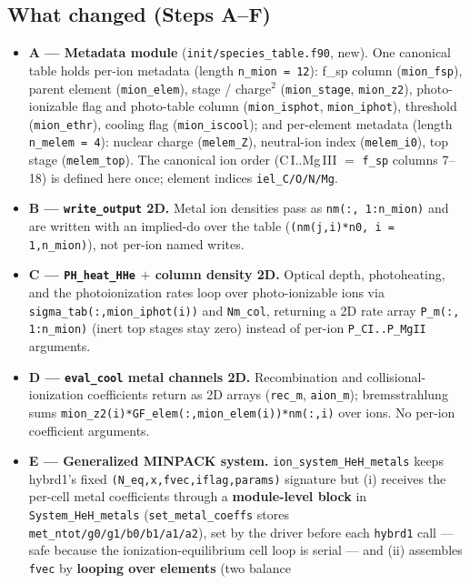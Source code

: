 \documentclass[english,a4paper]{kiseon_memo}
\begin{document}
\subsection{What changed (Steps A--F)}

{\sloppy
\begin{itemize}
\item \textbf{A --- Metadata module} (\texttt{init/species\_table.f90}, new). One
  canonical table holds per-ion metadata (length \verb|n_mion = 12|): f\_sp
  column (\verb|mion_fsp|), parent element (\verb|mion_elem|), stage / charge$^2$
  (\verb|mion_stage|, \verb|mion_z2|), photo-ionizable flag and photo-table column
  (\verb|mion_isphot|, \verb|mion_iphot|), threshold (\verb|mion_ethr|), cooling
  flag (\verb|mion_iscool|); and per-element metadata (length \verb|n_melem = 4|):
  nuclear charge (\verb|melem_Z|), neutral-ion index (\verb|melem_i0|), top stage
  (\verb|melem_top|). The canonical ion order (C\,I..Mg\,III $=$ \texttt{f\_sp}
  columns 7--18) is defined here once; element indices \verb|iel_C/O/N/Mg|.
\item \textbf{B --- \texttt{write\_output} 2D.} Metal ion densities pass as
  \verb|nm(:, 1:n_mion)| and are written with an implied-do over the table
  (\verb|(nm(j,i)*n0, i = 1,n_mion)|), not per-ion named writes.
\item \textbf{C --- \texttt{PH\_heat\_HHe} $+$ column density 2D.} Optical depth,
  photoheating, and the photoionization rates loop over photo-ionizable ions via
  \verb|sigma_tab(:,mion_iphot(i))| and \verb|Nm_col|, returning a 2D rate array
  \verb|P_m(:, 1:n_mion)| (inert top stages stay zero) instead of per-ion
  \verb|P_CI..P_MgII| arguments.
\item \textbf{D --- \texttt{eval\_cool} metal channels 2D.} Recombination and
  collisional-ionization coefficients return as 2D arrays (\verb|rec_m|,
  \verb|aion_m|); bremsstrahlung sums
  \verb|mion_z2(i)*GF_elem(:,mion_elem(i))*nm(:,i)| over ions. No per-ion
  coefficient arguments.
\item \textbf{E --- Generalized MINPACK system.} \verb|ion_system_HeH_metals| keeps
  hybrd1's fixed \verb|(N_eq,x,fvec,iflag,params)| signature but (i) receives the
  per-cell metal coefficients through a \textbf{module-level block} in
  \verb|System_HeH_metals| (\verb|set_metal_coeffs| stores
  \verb|met_ntot/g0/g1/b0/b1/a1/a2|), set by the driver before each \verb|hybrd1|
  call --- safe because the ionization-equilibrium cell loop is serial --- and
  (ii) assembles \verb|fvec| by \textbf{looping over elements} (two balance

\end{itemize}}
\end{document}
